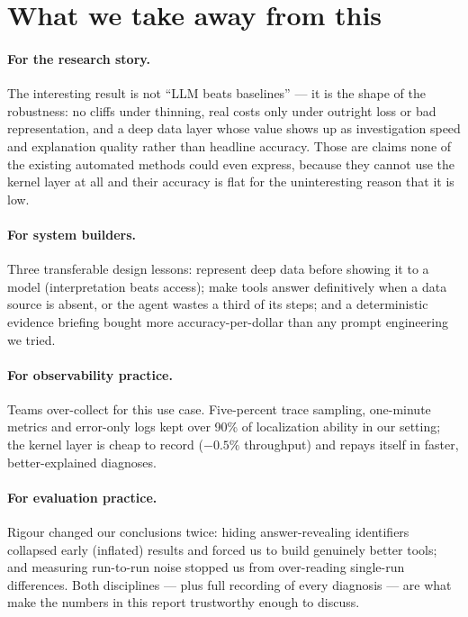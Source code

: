 \section{What we take away from this}
\label{sec:takeaways}

\paragraph{For the research story.} The interesting result is not ``LLM beats
baselines'' --- it is the shape of the robustness: no cliffs under thinning, real
costs only under outright loss or bad representation, and a deep data layer whose
value shows up as investigation speed and explanation quality rather than headline
accuracy. Those are claims none of the existing automated methods could even
express, because they cannot use the kernel layer at all and their accuracy is flat
for the uninteresting reason that it is low.

\paragraph{For system builders.} Three transferable design lessons: represent deep
data before showing it to a model (interpretation beats access); make tools answer
definitively when a data source is absent, or the agent wastes a third of its steps;
and a deterministic evidence briefing bought more accuracy-per-dollar than any
prompt engineering we tried.

\paragraph{For observability practice.} Teams over-collect for this use case.
Five-percent trace sampling, one-minute metrics and error-only logs kept over 90\%
of localization ability in our setting; the kernel layer is cheap to record
($-0.5\%$ throughput) and repays itself in faster, better-explained diagnoses.

\paragraph{For evaluation practice.} Rigour changed our conclusions twice: hiding
answer-revealing identifiers collapsed early (inflated) results and forced us to
build genuinely better tools; and measuring run-to-run noise stopped us from
over-reading single-run differences. Both disciplines --- plus full recording of
every diagnosis --- are what make the numbers in this report trustworthy enough to
discuss.
